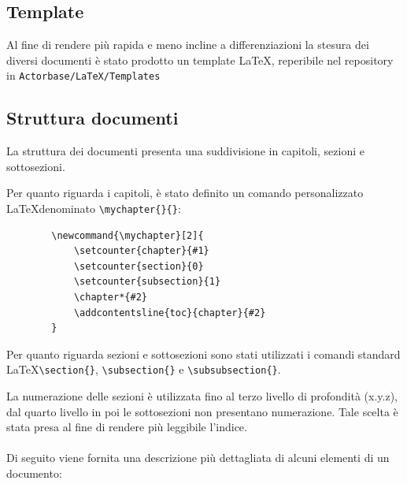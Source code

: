 \documentclass[a4paper]{report}
\newcommand{\mychapter}[2]{
	\setcounter{chapter}{#1}
	\setcounter{section}{0}
	\setcounter{subsection}{1}
	\chapter*{#2}
	\addcontentsline{toc}{chapter}{#2}
}
\begin{document}
	\subsection{Template}
	Al fine di rendere più rapida e meno incline a differenziazioni la stesura dei diversi documenti è stato prodotto un
	template \LaTeX, reperibile nel repository in \verb|Actorbase/LaTeX/Templates|
	\subsection{Struttura documenti}
	La struttura dei documenti presenta una suddivisione in capitoli, sezioni e sottosezioni. 
	
	Per quanto riguarda i capitoli, è stato definito un comando personalizzato \LaTeX \space denominato
	\verb|\mychapter{}{}|:
	\begin{verbatim}
		\newcommand{\mychapter}[2]{
			\setcounter{chapter}{#1}
			\setcounter{section}{0}
			\setcounter{subsection}{1}
			\chapter*{#2}
			\addcontentsline{toc}{chapter}{#2}
		}
	\end{verbatim}
	Per quanto riguarda sezioni e sottosezioni sono stati utilizzati i comandi standard \LaTeX \space \verb|\section{}|, 
	\verb|\subsection{}| e \verb|\subsubsection{}|.

	La numerazione delle sezioni è utilizzata fino al terzo livello di profondità (x.y.z), dal quarto livello in poi le sottosezioni
	 non presentano numerazione. Tale scelta è stata presa al fine di rendere più leggibile l'indice.
	\\ \\
	Di seguito viene fornita una descrizione più dettagliata di alcuni elementi di un documento: 
\end{document}
